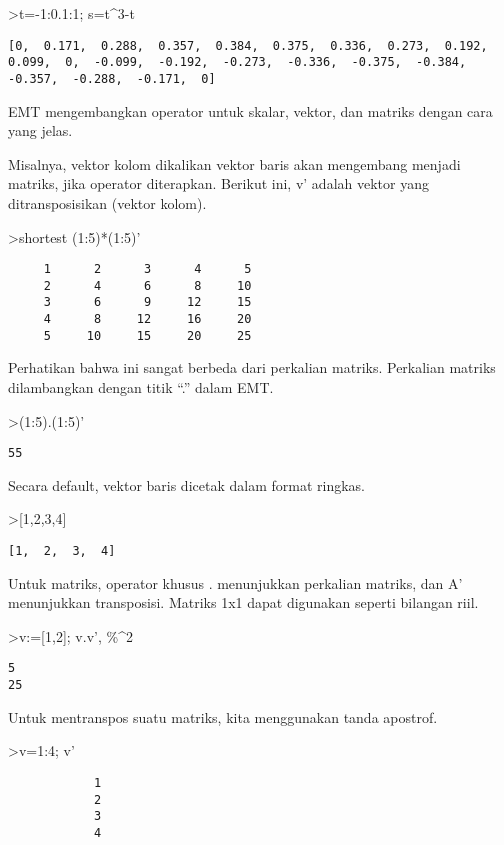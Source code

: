 \documentclass[
]{book}
\begin{document}
\textgreater t=-1:0.1:1; s=t\^{}3-t

\begin{verbatim}
[0,  0.171,  0.288,  0.357,  0.384,  0.375,  0.336,  0.273,  0.192,
0.099,  0,  -0.099,  -0.192,  -0.273,  -0.336,  -0.375,  -0.384,
-0.357,  -0.288,  -0.171,  0]
\end{verbatim}

EMT mengembangkan operator untuk skalar, vektor, dan matriks dengan cara yang jelas.

Misalnya, vektor kolom dikalikan vektor baris akan mengembang menjadi matriks, jika operator diterapkan. Berikut ini, v' adalah vektor yang ditransposisikan (vektor kolom).

\textgreater shortest (1:5)*(1:5)'

\begin{verbatim}
     1      2      3      4      5 
     2      4      6      8     10 
     3      6      9     12     15 
     4      8     12     16     20 
     5     10     15     20     25 
\end{verbatim}

Perhatikan bahwa ini sangat berbeda dari perkalian matriks. Perkalian matriks dilambangkan dengan titik ``.'' dalam EMT.

\textgreater(1:5).(1:5)'

\begin{verbatim}
55
\end{verbatim}

Secara default, vektor baris dicetak dalam format ringkas.

\textgreater{[}1,2,3,4{]}

\begin{verbatim}
[1,  2,  3,  4]
\end{verbatim}

Untuk matriks, operator khusus . menunjukkan perkalian matriks, dan A' menunjukkan transposisi. Matriks 1x1 dapat digunakan seperti bilangan riil.

\textgreater v:={[}1,2{]}; v.v', \%\^{}2

\begin{verbatim}
5
25
\end{verbatim}

Untuk mentranspos suatu matriks, kita menggunakan tanda apostrof.

\textgreater v=1:4; v'

\begin{verbatim}
            1 
            2 
            3 
            4 
\end{verbatim}
\end{document}
